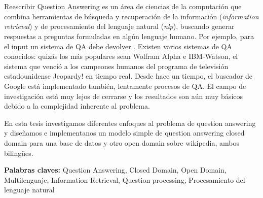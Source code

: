 \chapter*{\runtitulo}
{\color{red} Reescribir}
Question Answering es un área de ciencias de la computación que combina herramientas de búsqueda y recuperación
de la información (\textit{information retrieval}) y de procesamiento del lenguaje natural (\textit{nlp}), buscando
generar respuestas a preguntas formuladas en algún lenguaje humano.
Por ejemplo, para el input \textit{} un sistema de QA debe devolver . 
Existen varios sistemas de QA conocidos: quizás los más populares sean Wolfram Alpha e IBM-Watson, el sistema que venció a los campeones humanos del 
programa de televisión estadounidense Jeopardy! en tiempo real. Desde hace un tiempo, el buscador de Google está implementado también, lentamente
procesos de QA. El campo de investigación está muy lejos de cerrarse y los resultados son aún muy básicos debido a la complejidad inherente al problema. 

En esta tesis investigamos diferentes enfoques al problema de question answering y diseñamos e implementanos un modelo simple de question answering closed domain para una base de datos y otro open domain sobre wikipedia, ambos bilingües. 
\bigskip

\noindent\textbf{Palabras claves:} Question Answering, Closed Domain, Open Domain, Multilenguaje, Information Retrieval, Question processing, Procesamiento del lenguaje natural
